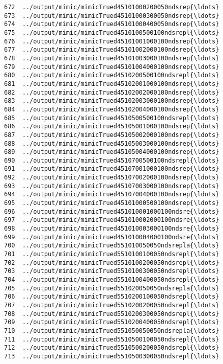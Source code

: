 \documentclass[11pt]{article}
\begin{document}
\begin{Verbatim}[commandchars=\\\{\}]
672  ../output/mimic/mimicTrued45101000200050ndsrep{\ldots}  
673  ../output/mimic/mimicTrued45101000300050ndsrep{\ldots}  
674  ../output/mimic/mimicTrued45101000400050ndsrep{\ldots}  
675  ../output/mimic/mimicTrued4510100500100ndsrepl{\ldots}  
676  ../output/mimic/mimicTrued45101001000100ndsrep{\ldots}  
677  ../output/mimic/mimicTrued45101002000100ndsrep{\ldots}  
678  ../output/mimic/mimicTrued45101003000100ndsrep{\ldots}  
679  ../output/mimic/mimicTrued45101004000100ndsrep{\ldots}  
680  ../output/mimic/mimicTrued4510200500100ndsrepl{\ldots}  
681  ../output/mimic/mimicTrued45102001000100ndsrep{\ldots}  
682  ../output/mimic/mimicTrued45102002000100ndsrep{\ldots}  
683  ../output/mimic/mimicTrued45102003000100ndsrep{\ldots}  
684  ../output/mimic/mimicTrued45102004000100ndsrep{\ldots}  
685  ../output/mimic/mimicTrued4510500500100ndsrepl{\ldots}  
686  ../output/mimic/mimicTrued45105001000100ndsrep{\ldots}  
687  ../output/mimic/mimicTrued45105002000100ndsrep{\ldots}  
688  ../output/mimic/mimicTrued45105003000100ndsrep{\ldots}  
689  ../output/mimic/mimicTrued45105004000100ndsrep{\ldots}  
690  ../output/mimic/mimicTrued4510700500100ndsrepl{\ldots}  
691  ../output/mimic/mimicTrued45107001000100ndsrep{\ldots}  
692  ../output/mimic/mimicTrued45107002000100ndsrep{\ldots}  
693  ../output/mimic/mimicTrued45107003000100ndsrep{\ldots}  
694  ../output/mimic/mimicTrued45107004000100ndsrep{\ldots}  
695  ../output/mimic/mimicTrued45101000500100ndsrep{\ldots}  
696  ../output/mimic/mimicTrued451010001000100ndsre{\ldots}  
697  ../output/mimic/mimicTrued451010002000100ndsre{\ldots}  
698  ../output/mimic/mimicTrued451010003000100ndsre{\ldots}  
699  ../output/mimic/mimicTrued451010004000100ndsre{\ldots}  
700  ../output/mimic/mimicTrued551010050050ndsrepla{\ldots}  
701  ../output/mimic/mimicTrued5510100100050ndsrepl{\ldots}  
702  ../output/mimic/mimicTrued5510100200050ndsrepl{\ldots}  
703  ../output/mimic/mimicTrued5510100300050ndsrepl{\ldots}  
704  ../output/mimic/mimicTrued5510100400050ndsrepl{\ldots}  
705  ../output/mimic/mimicTrued551020050050ndsrepla{\ldots}  
706  ../output/mimic/mimicTrued5510200100050ndsrepl{\ldots}  
707  ../output/mimic/mimicTrued5510200200050ndsrepl{\ldots}  
708  ../output/mimic/mimicTrued5510200300050ndsrepl{\ldots}  
709  ../output/mimic/mimicTrued5510200400050ndsrepl{\ldots}  
710  ../output/mimic/mimicTrued551050050050ndsrepla{\ldots}  
711  ../output/mimic/mimicTrued5510500100050ndsrepl{\ldots}  
712  ../output/mimic/mimicTrued5510500200050ndsrepl{\ldots}  
713  ../output/mimic/mimicTrued5510500300050ndsrepl{\ldots}  

\end{Verbatim}
\end{document}
